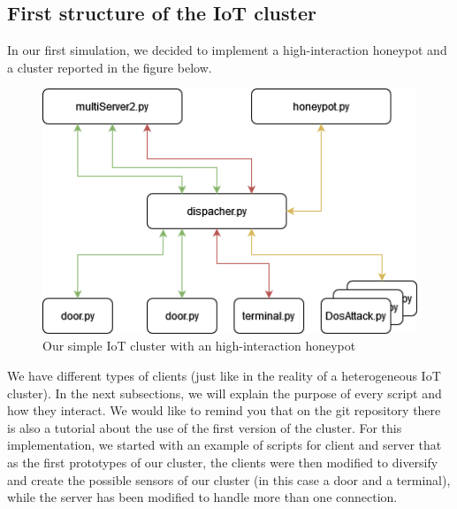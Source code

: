 \subsection{ First structure of the IoT cluster}
In our first simulation, we decided to implement a high-interaction honeypot and a cluster reported in the figure below.
\begin{figure}[h!]
  \centering
  \includegraphics[width = 12cm]{images/HighInterationHoneypot.drawio.png}
  \caption{Our simple IoT cluster with an high-interaction honeypot}
  \label{fig:DosImpl1}
\end{figure}
\FloatBarrier
\noindent
We have different types of clients (just like in the reality of a heterogeneous IoT cluster).
In the next subsections, we will explain the purpose of every script and how they interact. We would like to remind you that on the git repository there is also a tutorial about the use of the first version of the cluster.
For this implementation, we started with an example of scripts for client and server that as the first prototypes of our cluster, the clients were then modified to diversify and create the possible sensors of our cluster (in this case a door and a terminal), while the server has been modified to handle more than one connection.

